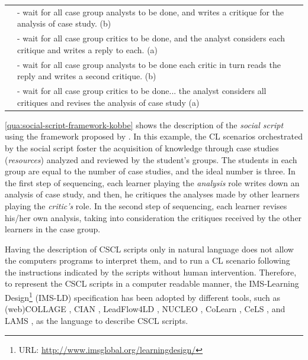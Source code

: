 \begin{quadro}[htb]
\begin{tabular}{l p{12cm}}
& - wait for all case group analysts to be done, and writes a critique for the analysis of case study. (b) \\
& - wait for all case group critics to be done, and the analyst considers each critique and writes a reply to each. (a) \\
& - wait for all case group analysts to be done each critic in turn reads the reply and writes a second critique. (b) \\
& - wait for all case group critics to be done... the analyst considers all critiques and revises the analysis of case study (a) \\
\bottomrule
\end{tabular}
\end{quadro}


\autoref{qua:social-script-framework-kobbe} shows the description of the \emph{social script} \cite{WeinbergerErtlFischerMandl2005} using the framework proposed by .
In this example, the CL scenarios orchestrated by the social script foster the acquisition of knowledge through case studies (\emph{resources}) analyzed and reviewed by the student’s groups.
The students in each group are equal to the number of case studies, and the ideal number is three.
In the first step of sequencing, each learner playing the \emph{analysis} role writes down an analysis of case study, and then, he critiques the analyses made by other learners playing the \emph{critic’s} role.
In the second step of sequencing, each learner revises his/her own analysis, taking into consideration the critiques received by the other learners in the case group.

Having the description of CSCL scripts only in natural language does not allow the computers programs to interpret them, and to run a CL scenario following the instructions indicated by the scripts without human intervention.
Therefore, to represent the CSCL scripts in a computer readable manner, the IMS-Learning Design\footnote{URL: \url{http://www.imsglobal.org/learningdesign/}} (IMS-LD) specification has been adopted by different tools, such as (web)COLLAGE \cite{Hernandez-LeoVillasclaras-FernandezAsensio-PerezDimitriadisJorrin-AbellanRuiz-RequiesRubia-Avi2006,Villasclaras-FernandezHernandez-LeoAsensio-PerezDimitriadis2013}, CIAN \cite{MolinaRedondoOrtega2012}, LeadFlow4LD \cite{Palomino-RamirezBote-LorenzoAsensio-PerezDimitriadis2008}, NUCLEO \cite{SanchoFuentes-FernandezFernandez-Manjon2008}, CoLearn \cite{StylianakisArapiMoumoutzisChristodoulakis2013}, CeLS \cite{RonenKohen-Vacs2009}, and LAMS \cite{Romero-MorenoOrtegaTroyano2007}, as the language to describe CSCL scripts.
 
